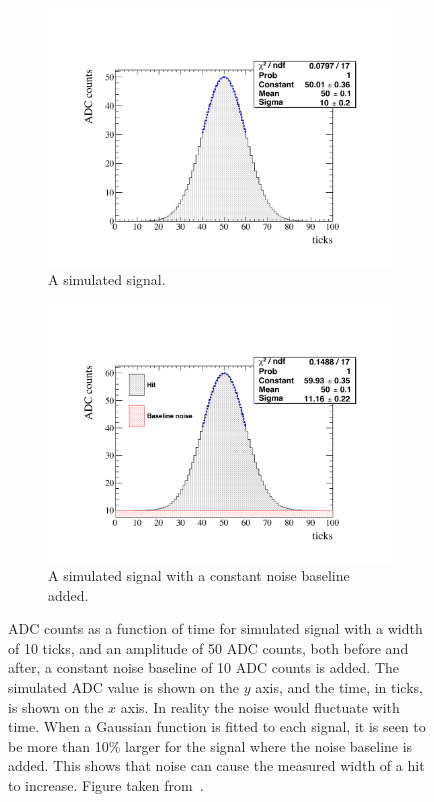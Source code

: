 \begin{figure}[h!]
  \centering
  \begin{subfigure}{0.48\textwidth}
    \centering
    \includegraphics[width=\textwidth]{ToyGauss_Raw}
    \caption{A simulated signal.}
  \end{subfigure}%
  \hspace{0.03\textwidth}%
  \begin{subfigure}{0.48\textwidth}
    \centering
    \includegraphics[width=\textwidth]{ToyGauss_Noise}
    \caption{A simulated signal with a constant noise baseline added.}
  \end{subfigure}
  \caption[The effect of adding a noise baseline to a hit]
          {ADC counts as a function of time for  simulated signal with a width of 10 ticks, and an amplitude of 50 ADC counts, both before and after, a constant noise baseline of 10 ADC counts is added. The simulated ADC value is shown on the $y$ axis, and the time, in ticks, is shown on the $x$ axis. In reality the noise would fluctuate with time. When a Gaussian function is fitted to each signal, it is seen to be more than 10\% larger for the signal where the noise baseline is added. This shows that noise can cause the measured width of a hit to increase. Figure taken from~\citep{DomSeptMeeting}.}
          \label{fig:DomsHitModel}
\end{figure}  

